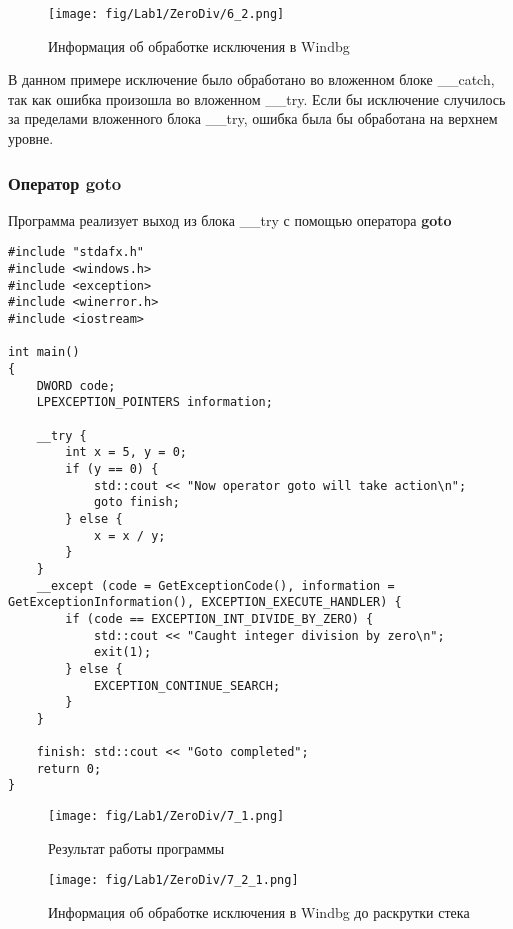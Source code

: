\begin{figure}[H]
    \begin{center}
        \texttt{[image: fig/Lab1/ZeroDiv/6\_2.png]}
        \caption{Информация об обработке исключения в Windbg}
        \label{pic:6_2}
    \end{center}
\end{figure}

В данном примере исключение было обработано во вложенном блоке \_\_catch, так как ошибка произошла во вложенном \_\_try. Если бы исключение случилось за пределами вложенного блока \_\_try, ошибка была бы обработана на верхнем уровне.
\subsubsection{Оператор goto}
Программа реализует выход из блока \_\_try с помощью оператора \textbf{goto}

\begin{lstlisting}[caption=Выход из блока с помозью оператора goto]
#include "stdafx.h"
#include <windows.h>
#include <exception>
#include <winerror.h>
#include <iostream>

int main()
{
    DWORD code;
    LPEXCEPTION_POINTERS information;

    __try {
        int x = 5, y = 0;
        if (y == 0) {
            std::cout << "Now operator goto will take action\n";
            goto finish;
        } else {
            x = x / y;
        }
    }
    __except (code = GetExceptionCode(), information = GetExceptionInformation(), EXCEPTION_EXECUTE_HANDLER) {
        if (code == EXCEPTION_INT_DIVIDE_BY_ZERO) {
            std::cout << "Caught integer division by zero\n";
            exit(1);
        } else {
            EXCEPTION_CONTINUE_SEARCH;
        }
    }

    finish: std::cout << "Goto completed";
    return 0;
}
\end{lstlisting}

\begin{figure}[H]
    \begin{center}
        \texttt{[image: fig/Lab1/ZeroDiv/7\_1.png]}
        \caption{Результат работы программы}
        \label{pic:7_1}
    \end{center}
\end{figure}

\begin{figure}[H]
    \begin{center}
        \texttt{[image: fig/Lab1/ZeroDiv/7\_2\_1.png]}
        \caption{Информация об обработке исключения в Windbg до раскрутки стека}
        \label{pic:7_2_1}
    \end{center}
\end{figure}

